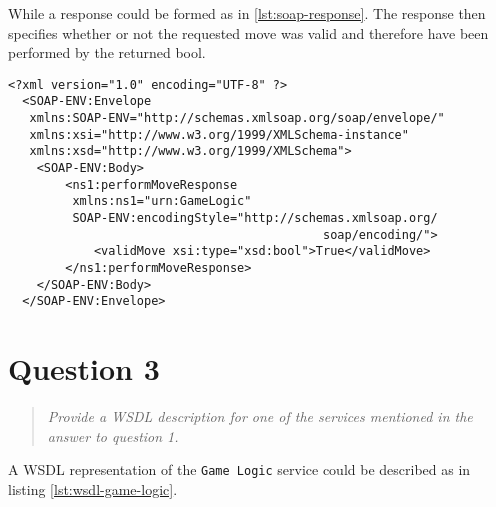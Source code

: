 \documentclass[10pt,a4paper]{report}
\begin{document}
While a response could be formed as in \ref{lst:soap-response}. The response then specifies whether or not the requested move was valid and therefore have been performed by the returned bool.

\begin{lstlisting}[caption="SOAP response", label={lst:soap-response}]
<?xml version="1.0" encoding="UTF-8" ?>
  <SOAP-ENV:Envelope
   xmlns:SOAP-ENV="http://schemas.xmlsoap.org/soap/envelope/"
   xmlns:xsi="http://www.w3.org/1999/XMLSchema-instance"
   xmlns:xsd="http://www.w3.org/1999/XMLSchema">
	<SOAP-ENV:Body>
		<ns1:performMoveResponse
		 xmlns:ns1="urn:GameLogic"
		 SOAP-ENV:encodingStyle="http://schemas.xmlsoap.org/
		                                    soap/encoding/">
			<validMove xsi:type="xsd:bool">True</validMove>
		</ns1:performMoveResponse>
	</SOAP-ENV:Body>
  </SOAP-ENV:Envelope>
\end{lstlisting}


\section{Question 3}
\begin{quote}
\textit{Provide a WSDL description for one of the services mentioned in the answer to question 1.}
\end{quote}

A WSDL representation of the \texttt{Game Logic} service could be described as in listing \ref{lst:wsdl-game-logic}.
\end{document}
